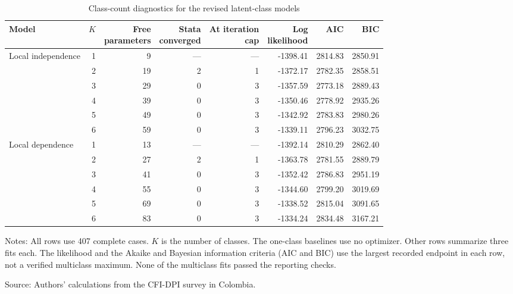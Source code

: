 \begin{table}[!htbp]
\centering
\caption{Class-count diagnostics for the revised latent-class models}
\label{tab:revised-lca}
\begin{minipage}{\linewidth}
\centering\small
\setlength{\tabcolsep}{4.5pt}
\begin{tabular}{@{}lrrrrrrr@{}}
\toprule
Model & $K$ & \shortstack{Free\\parameters} & \shortstack{Stata\\converged}
& \shortstack{At iteration\\cap} & \shortstack{Log\\likelihood} & AIC & BIC \\
\midrule
Local independence & 1 & 9 & --- & --- & -1398.41 & 2814.83 & 2850.91 \\
                   & 2 & 19 & 2 & 1 & -1372.17 & 2782.35 & 2858.51 \\
                   & 3 & 29 & 0 & 3 & -1357.59 & 2773.18 & 2889.43 \\
                   & 4 & 39 & 0 & 3 & -1350.46 & 2778.92 & 2935.26 \\
                   & 5 & 49 & 0 & 3 & -1342.92 & 2783.83 & 2980.26 \\
                   & 6 & 59 & 0 & 3 & -1339.11 & 2796.23 & 3032.75 \\
\midrule
Local dependence & 1 & 13 & --- & --- & -1392.14 & 2810.29 & 2862.40 \\
                   & 2 & 27 & 2 & 1 & -1363.78 & 2781.55 & 2889.79 \\
                   & 3 & 41 & 0 & 3 & -1352.42 & 2786.83 & 2951.19 \\
                   & 4 & 55 & 0 & 3 & -1344.60 & 2799.20 & 3019.69 \\
                   & 5 & 69 & 0 & 3 & -1338.52 & 2815.04 & 3091.65 \\
                   & 6 & 83 & 0 & 3 & -1334.24 & 2834.48 & 3167.21 \\
\bottomrule
\end{tabular}
\par\smallskip\footnotesize\raggedright
Notes: All rows use 407 complete cases. $K$ is the number of classes.
The one-class baselines use no optimizer. Other rows summarize three
fits each. The likelihood and the Akaike and Bayesian information criteria
(AIC and BIC) use the largest recorded endpoint in each row, not a verified
multiclass maximum. None of the multiclass fits passed the reporting checks.\par
Source: Authors' calculations from the CFI-DPI survey in Colombia.
\end{minipage}
\end{table}

